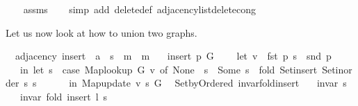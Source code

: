 \begin{isabellebody}
%
\isadelimproof
\ \ %
\endisadelimproof
%
\isatagproof
{}\isamarkupfalse%
\ assms\isanewline
\ \ \isamarkupfalse%
\ {\isacharparenleft}{\kern0pt}simp\ add{\isacharcolon}{\kern0pt}\ delete{\isacharprime}{\kern0pt}{\isacharunderscore}{\kern0pt}def\ adjacency{\isacharunderscore}{\kern0pt}list{\isacharunderscore}{\kern0pt}delete{\isacharunderscore}{\kern0pt}cong{\isacharparenright}{\kern0pt}%
\endisatagproof
{\isafoldproof}%
%
\isadelimproof
%
\endisadelimproof
%
\begin{isamarkuptext}%
Let us now look at how to union two graphs.%
\end{isamarkuptext}\isamarkuptrue%
\isamarkupfalse%
\ {\isacharparenleft}{\kern0pt}\ adjacency{\isacharparenright}{\kern0pt}\ insert{\isacharunderscore}{\kern0pt}{}\ {\isacharcolon}{\kern0pt}{\isacharcolon}{\kern0pt}\ {\isachardoublequoteopen}{\isacharprime}{\kern0pt}a\ {\isasymtimes}\ {\isacharprime}{\kern0pt}s\ {\isasymRightarrow}\ {\isacharprime}{\kern0pt}m\ {\isasymRightarrow}\ {\isacharprime}{\kern0pt}m{\isachardoublequoteclose}\ \isanewline
\ \ {\isachardoublequoteopen}insert{\isacharunderscore}{\kern0pt}{}\ p\ G\ {\isasymequiv}\isanewline
\ \ \ let\ v\ {\isacharequal}{\kern0pt}\ fst\ p{\isacharsemicolon}{\kern0pt}\ s\ {\isacharequal}{\kern0pt}\ snd\ p\isanewline
\ \ \ in\ let\ s{\isacharprime}{\kern0pt}\ {\isacharequal}{\kern0pt}\ case\ Map{\isacharunderscore}{\kern0pt}lookup\ G\ v\ of\ None\ {\isasymRightarrow}\ s\ {\isacharbar}{\kern0pt}\ Some\ s{\isacharprime}{\kern0pt}{\isacharprime}{\kern0pt}\ {\isasymRightarrow}\ fold\ Set{\isacharunderscore}{\kern0pt}insert\ {\isacharparenleft}{\kern0pt}Set{\isacharunderscore}{\kern0pt}inorder\ s{\isacharparenright}{\kern0pt}\ s{\isacharprime}{\kern0pt}{\isacharprime}{\kern0pt}\isanewline
\ \ \ \ \ \ in\ Map{\isacharunderscore}{\kern0pt}update\ v\ s{\isacharprime}{\kern0pt}\ G{\isachardoublequoteclose}\isanewline
%
\isadeliminvisible
\isanewline
%
\endisadeliminvisible
%
\isataginvisible
{}\isamarkupfalse%
\ {\isacharparenleft}{\kern0pt}\ Set{\isacharunderscore}{\kern0pt}by{\isacharunderscore}{\kern0pt}Ordered{\isacharparenright}{\kern0pt}\ invar{\isacharunderscore}{\kern0pt}fold{\isacharunderscore}{\kern0pt}insert{\isacharcolon}{\kern0pt}\isanewline
\ \ \ {\isachardoublequoteopen}invar\ s{\isachardoublequoteclose}\isanewline
\ \ \ {\isachardoublequoteopen}invar\ {\isacharparenleft}{\kern0pt}fold\ insert\ l\ s{\isacharparenright}{\kern0pt}{\isachardoublequoteclose}%

\end{isabellebody}
